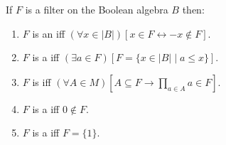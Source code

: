 If $F$ is a filter on the Boolean algebra $B$ then:
\begin{enumerate}
\item $F$ is an  iff $(\forall x \in |B|)[x \in F \leftrightarrow -x \notin F]$.
\item $F$ is a  iff $(\exists a \in F)[F = \{x \in |B| \mid a \leq x\}]$.
\item $F$ is  iff $(\forall A \in M)\left[A \subseteq F \rightarrow \prod_{a \in A} a \in F\right]$.
\item $F$ is a  iff $0 \notin F$.
\item $F$ is a  iff $F = \{1\}$.
\end{enumerate}

